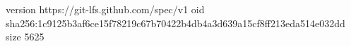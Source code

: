 version https://git-lfs.github.com/spec/v1
oid sha256:1c9125b3af6ce15f78219c67b70422b4db4a3d639a15cf8ff213eda514e032dd
size 5625
